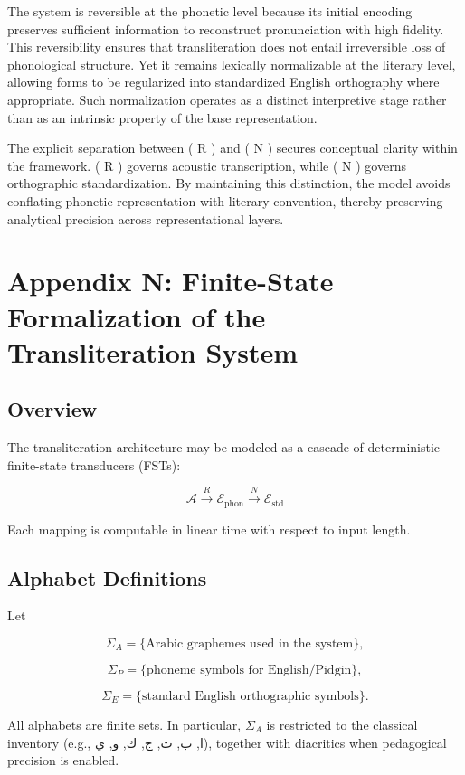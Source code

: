 \documentclass[12pt]{article}
\newcommand{\AR}[1]{\foreignlanguage{arabic}{#1}}
\begin{document}
The system is reversible at the phonetic level because its initial encoding preserves sufficient information to reconstruct pronunciation with high fidelity. This reversibility ensures that transliteration does not entail irreversible loss of phonological structure. Yet it remains lexically normalizable at the literary level, allowing forms to be regularized into standardized English orthography where appropriate. Such normalization operates as a distinct interpretive stage rather than as an intrinsic property of the base representation.

The explicit separation between ( R ) and ( N ) secures conceptual clarity within the framework. ( R ) governs acoustic transcription, while ( N ) governs orthographic standardization. By maintaining this distinction, the model avoids conflating phonetic representation with literary convention, thereby preserving analytical precision across representational layers.

\section{Appendix N: Finite-State Formalization of the Transliteration System}

\subsection{Overview}

The transliteration architecture may be modeled as a cascade of deterministic finite-state transducers (FSTs):

\[
\mathcal{A} \xrightarrow{R} \mathcal{E}_{\text{phon}} \xrightarrow{N} \mathcal{E}_{\text{std}}
\]

Each mapping is computable in linear time with respect to input length.

\subsection{Alphabet Definitions}

Let

\[
\Sigma_A = \{\text{Arabic graphemes used in the system}\},
\]

\[
\Sigma_P = \{\text{phoneme symbols for English/Pidgin}\},
\]

\[
\Sigma_E = \{\text{standard English orthographic symbols}\}.
\]

All alphabets are finite sets. In particular, $\Sigma_A$ is restricted to the classical inventory (e.g., \AR{ا}, \AR{ب}, \AR{ت}, \AR{ج}, \AR{ك}, \AR{و}, \AR{ي}), together with diacritics when pedagogical precision is enabled.
\end{document}
